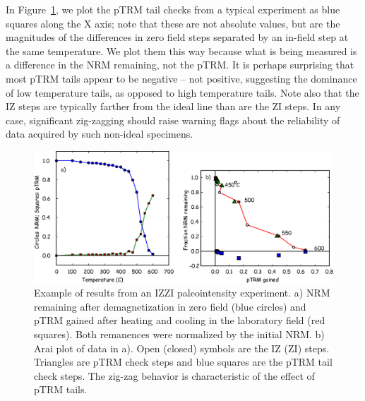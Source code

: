   In Figure~\ref{fig:zigzag}, we plot the  pTRM tail checks from a typical experiment as blue squares along the X axis;  note that these are not absolute values, but are the magnitudes of the differences in zero field steps separated by an in-field step at the same temperature.  We plot them this way because what is being measured is a difference in the NRM remaining, not the pTRM.  It is perhaps surprising that most pTRM tails appear to be negative -- not positive, suggesting the dominance of  low temperature tails, as opposed to  high temperature tails. Note also that the IZ steps are typically farther from the ideal line than are the ZI steps.  In any case, significant zig-zagging should raise warning flags about the reliability of data acquired by such non-ideal specimens.  

 

\begin{figure}[h!tb]
\centering  \includegraphics[width= 14 cm]{EPSfiles/zigzag.eps}
\caption{Example of results from an IZZI paleointensity experiment.  a) NRM remaining after demagnetization in zero field (blue circles) and pTRM gained after heating and cooling  in the laboratory field (red squares).  Both remanences were normalized by the initial NRM.   b) Arai plot of data in  a).   Open (closed) symbols are the IZ (ZI) steps.  Triangles are pTRM check steps and blue squares are the pTRM tail check steps.    The zig-zag behavior is characteristic of the effect of pTRM tails. }
\label{fig:zigzag}
\end{figure}




